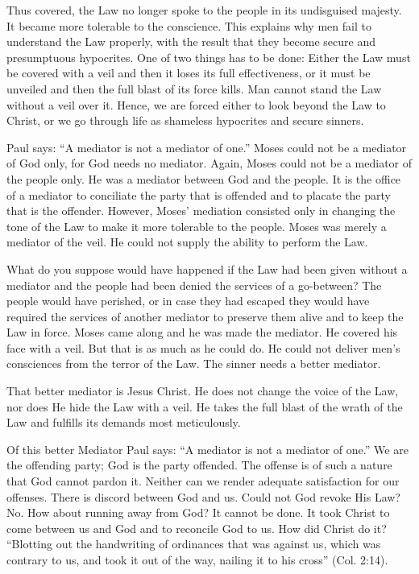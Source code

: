 Thus covered, the Law no longer spoke to the people in its undisguised majesty. It became more tolerable to the conscience. This explains why men fail to understand the Law properly, with the result that they become secure and presumptuous hypocrites. One of two things has to be done: Either the Law must be covered with a veil and then it loses its full effectiveness, or it must be unveiled and then the full blast of its force kills. Man cannot stand the Law without a veil over it. Hence, we are forced either to look beyond the Law to Christ, or we go through life as shameless hypocrites and secure sinners.

Paul says: “A mediator is not a mediator of one.” Moses could not be a mediator of God only, for God needs no mediator. Again, Moses could not be a mediator of the people only. He was a mediator between God and the people. It is the office of a mediator to conciliate the party that is offended and to placate the party that is the offender. However, Moses’ mediation consisted only in changing the tone of the Law to make it more tolerable to the people. Moses was merely a mediator of the veil. He could not supply the ability to perform the Law.

What do you suppose would have happened if the Law had been given without a mediator and the people had been denied the services of a go-between? The people would have perished, or in case they had escaped they would have required the services of another mediator to preserve them alive and to keep the Law in force. Moses came along and he was made the mediator. He covered his face with a veil. But that is as much as he could do. He could not deliver men’s consciences from the terror of the Law. The sinner needs a better mediator.

That better mediator is Jesus Christ. He does not change the voice of the Law, nor does He hide the Law with a veil. He takes the full blast of the wrath of the Law and fulfills its demands most meticulously.

Of this better Mediator Paul says: “A mediator is not a mediator of one.” We are the offending party; God is the party offended. The offense is of such a nature that God cannot pardon it. Neither can we render adequate satisfaction for our offenses. There is discord between God and us. Could not God revoke His Law? No. How about running away from God? It cannot be done. It took Christ to come between us and God and to reconcile God to us. How did Christ do it? “Blotting out the handwriting of ordinances that was against us, which was contrary to us, and took it out of the way, nailing it to his cross” (Col. 2:14).

